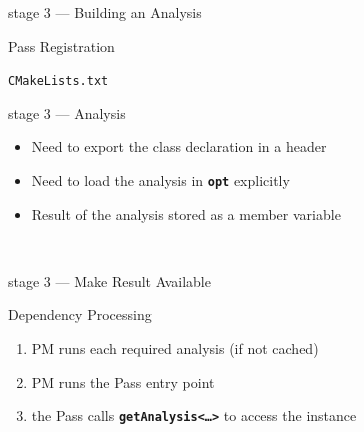 \documentclass[14pt]{beamer}
\newcommand{\Command}[1]{\textbf{\texttt{#1}}}
\newcommand{\Code}[1]{\textbf{\texttt{#1}}}
\begin{document}
    \begin{frame}[containsverbatim]{stage 3 --- Building an Analysis}
        \begin{alertblock}{Pass Registration}
        {
        \footnotesize
        
        }
        \end{alertblock}

        \begin{block}{\texttt{CMakeLists.txt}}
        {
        \footnotesize
        
        }
        \end{block}

    \end{frame}

    \begin{frame}[containsverbatim]{stage 3 --- Analysis}

        \begin{itemize}
            \item Need to export the class declaration in a header
            \item Need to load the analysis in \Command{opt} explicitly
            \item Result of the analysis stored as a member variable
        \end{itemize}

        \\
        {
        \footnotesize
        
        }
    \end{frame}

    \begin{frame}[containsverbatim]{stage 3 --- Make Result Available}
        \begin{alertblock}{Dependency Processing}
            \begin{enumerate}
                \item PM runs each required analysis (if not cached)
                \item PM runs the Pass entry point
                \item the Pass calls \Code{getAnalysis<\dots>} to access the instance
            \end{enumerate}
        \end{alertblock}
    \end{frame}
\end{document}
